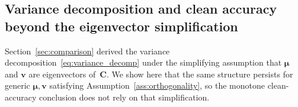 \documentclass[11pt]{article}
\newcommand{\C}{\mathbf{C}}
\newcommand{\bv}{\mathbf{v}}
\newcommand{\bmu}{\boldsymbol{\mu}}
\newcommand{\IS}[1]{\textcolor{blue}{{#1}}}
\newcommand{\DF}[1]{\textcolor{red}{{#1}}}
\begin{document}
\subsection{Variance decomposition and clean accuracy beyond the
eigenvector simplification}
\label{app:variance_decomp_general}
Section~\ref{sec:comparison} derived the variance
decomposition~\eqref{eq:variance_decomp} under the simplifying
assumption that $\bmu$ and $\bv$ are eigenvectors of~$\C$.  We show
here that the same structure persists for generic $\bmu,\bv$
satisfying Assumption~\ref{ass:orthogonality}, so the monotone
clean-accuracy conclusion does not rely on that simplification.
\end{document}
